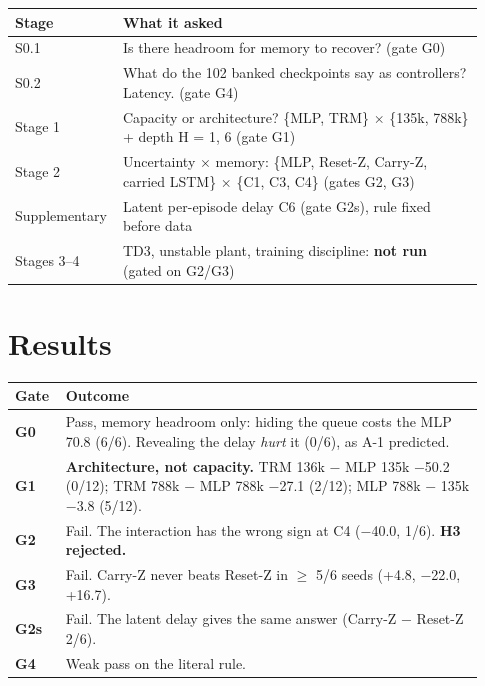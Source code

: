 \documentclass[11pt]{article}
\begin{document}
\begin{center}\small\begin{tabular}{>{\raggedright\arraybackslash}p{0.176\linewidth}>{\raggedright\arraybackslash}p{0.758\linewidth}}
\toprule
Stage & What it asked \\
\midrule
S0.1 & Is there headroom for memory to recover? (gate G0) \\
S0.2 & What do the 102 banked checkpoints say as controllers? Latency. (gate G4) \\
Stage 1 & Capacity or architecture? \{MLP, TRM\} $\times$ \{135k, 788k\} + depth H = 1, 6 (gate G1) \\
Stage 2 & Uncertainty $\times$ memory: \{MLP, Reset-Z, Carry-Z, carried LSTM\} $\times$ \{C1, C3, C4\} (gates G2, G3) \\
Supplementary & Latent per-episode delay C6 (gate G2s), rule fixed before data \\
Stages 3--4 & TD3, unstable plant, training discipline: \textbf{not run} (gated on G2/G3) \\
\bottomrule
\end{tabular}\end{center}



\section*{Results}



\begin{center}\small\begin{tabular}{>{\raggedright\arraybackslash}p{0.092\linewidth}>{\raggedright\arraybackslash}p{0.842\linewidth}}
\toprule
Gate & Outcome \\
\midrule
\textbf{G0} & Pass, memory headroom only: hiding the queue costs the MLP 70.8 (6/6). Revealing the delay \emph{hurt} it (0/6), as A-1 predicted. \\
\textbf{G1} & \textbf{Architecture, not capacity.} TRM 136k $-$ MLP 135k $-$50.2 (0/12); TRM 788k $-$ MLP 788k $-$27.1 (2/12); MLP 788k $-$ 135k $-$3.8 (5/12). \\
\textbf{G2} & Fail. The interaction has the wrong sign at C4 ($-$40.0, 1/6). \textbf{H3 rejected.} \\
\textbf{G3} & Fail. Carry-Z never beats Reset-Z in $\geq$ 5/6 seeds (+4.8, $-$22.0, +16.7). \\
\textbf{G2s} & Fail. The latent delay gives the same answer (Carry-Z $-$ Reset-Z 2/6). \\
\textbf{G4} & Weak pass on the literal rule. \\
\bottomrule
\end{tabular}\end{center}
\end{document}
